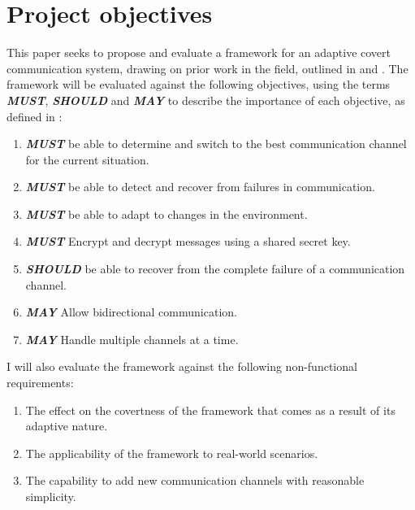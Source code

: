 \chapter{Project objectives}
\label{ch:objectives}

This paper seeks to propose and evaluate a framework for an adaptive covert communication system, drawing on prior work in the field, outlined in  and . The framework will be evaluated against the following objectives, using the terms \textit{\textbf{MUST}}, \textit{\textbf{SHOULD}} and \textit{\textbf{MAY}} to describe the importance of each objective, as defined in \cite{rfc2119}:

\begin{enumerate}
    \item \textit{\textbf{MUST}} be able to determine and switch to the best communication channel for the current situation.
    \item \textit{\textbf{MUST}} be able to detect and recover from failures in communication.
    \item \textit{\textbf{MUST}} be able to adapt to changes in the environment. 
    \item \textit{\textbf{MUST}} Encrypt and decrypt messages using a shared secret key.
    \item \textit{\textbf{SHOULD}} be able to recover from the complete failure of a communication channel.
    \item \textit{\textbf{MAY}} Allow bidirectional communication.
    \item \textit{\textbf{MAY}} Handle multiple channels at a time.
\end{enumerate}

I will also evaluate the framework against the following non-functional requirements:

\begin{enumerate}
    \item The effect on the covertness of the framework that comes as a result of its adaptive nature.
    \item The applicability of the framework to real-world scenarios.
    \item The capability to add new communication channels with reasonable simplicity.
\end{enumerate}


